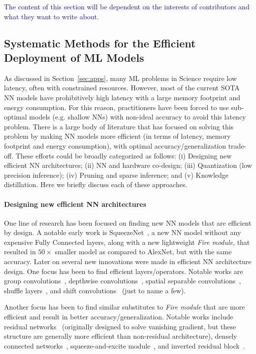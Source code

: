 \noindent 
\textcolor{blue}{
The content of this section will be dependent on the interests of contributors and what they want to write about.
}


\subsection{Systematic Methods for the Efficient Deployment of ML Models}

As discussed in Section~\ref{sec:apps}, many ML problems in Science
require low latency, often with
constrained resources. However, most of the current SOTA NN models have prohibitively high latency with a large
memory footprint and energy consumption. 
For this reason, practitioners have been forced to use sub-optimal models (e.g. shallow NNs)
with non-ideal accuracy to avoid this latency problem.
There is a large body of literature that has
focused on solving this problem by making NN models more efficient
(in terms of latency, memory footprint and energy consumption), with optimal
accuracy/generalization trade-off. These efforts could be broadly categorized as follows:
(i) Designing new efficient NN architectures;
(ii) NN and hardware co-design;
(iii) Quantization (low precision inference);
(iv) Pruning and sparse inference; and
(v) Knowledge distillation.
Here we briefly discuss each of these approaches.


\paragraph{Designing new efficient NN architectures}
One line of research has been focused on finding new NN models
that are efficient by design. A notable early work is SqueezeNet~\cite{iandola2016squeezenet},
a new NN model without any expensive Fully Connected layers,
along with a new lightweight \emph{Fire module}, that resulted
in $50\times$ smaller model as compared to AlexNet, but with the
same accuracy. Later on several new innovations were made in
efficient NN architecture design.
One focus has been to find efficient layers/operators.
Notable works are
group convolutions~\cite{ioannou2017deep}, 
depthwise convolutions~\cite{howard2017mobilenets},
spatial separable convolutions~\cite{mamalet2012simplifying},
shuffle layers~\cite{ma2018shufflenet},
and shift convolutions~\cite{wu2018shift} (just to name a few).

Another focus has been to find similar substitutes to \emph{Fire module} that are more efficient and result in better
accuracy/generalization. Notable works include
residual networks~\cite{he2016deep} (originally designed
to solve vanishing gradient, but these structure are generally more efficient
than non-residual architecture), densely connected networks~\cite{huang2017densely},
squeeze-and-excite module~\cite{hu2018squeeze},
and inverted residual block~\cite{sandler2018mobilenetv2}.

